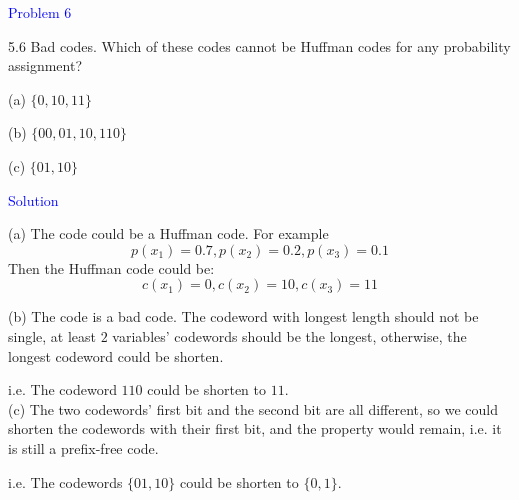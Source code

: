 \textcolor{blue}{Problem 6}

5.6 Bad codes. Which of these codes cannot be Huffman codes for
any probability assignment?

(a) $\{0, 10, 11\}$

(b) $\{ 00, 01, 10, 110\}$

(c) $\{01,10\}$

\textcolor{blue}{Solution}

(a) The code could be a Huffman code. For example
$$p(x_1)=0.7,p(x_2)=0.2,p(x_3)=0.1$$
Then the Huffman code could be:
$$c(x_1)=0,c(x_2)=10,c(x_3)=11$$

(b) The code is a bad code. The codeword with longest length should not be single, at least $2$ variables' codewords should be the longest, otherwise, the longest codeword could be shorten.

i.e. The codeword $110$ could be shorten to $11$. \\

(c) The two codewords' first bit and the second bit are all different, so we could shorten the codewords with their first bit, and the property would remain, i.e. it is still a prefix-free code.

i.e. The codewords $\{01,10\}$ could be shorten to $\{0,1\}$.